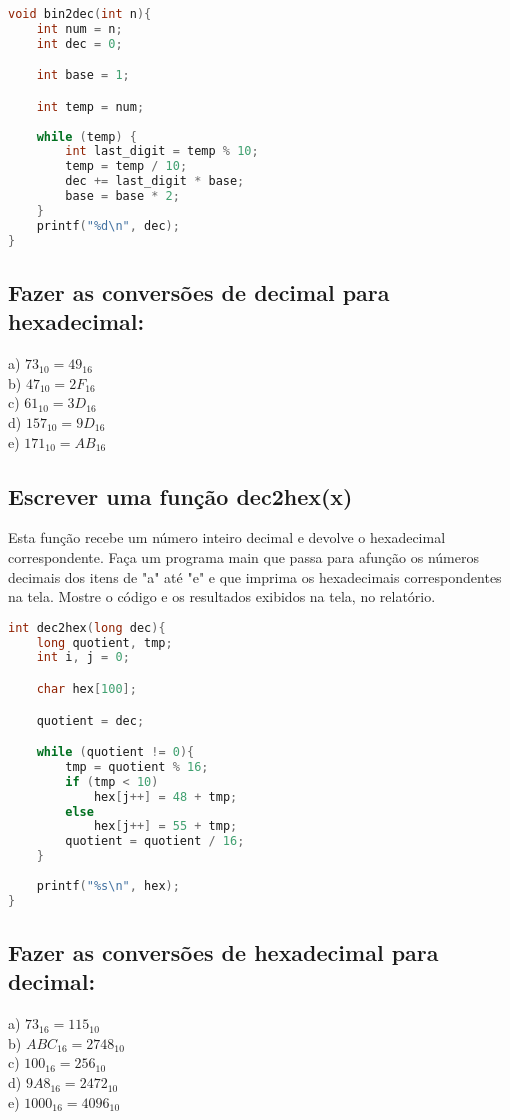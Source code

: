 \documentclass[12pt]{article}
\begin{document}
\begin{lstlisting}[language=C]
void bin2dec(int n){
    int num = n;
    int dec = 0;

    int base = 1;

    int temp = num;
    
    while (temp) {
        int last_digit = temp % 10;
        temp = temp / 10;
        dec += last_digit * base;
        base = base * 2;
    }
    printf("%d\n", dec);
}
\end{lstlisting}

\subsection{Fazer as conversões de decimal para hexadecimal:}
a) $73_{10}= 49_{16}$\\
b) $47_{10}= 2F_{16}$\\
c) $61_{10}= 3D_{16}$\\
d) $157_{10}= 9D_{16}$\\
e) $171_{10}= AB_{16}$\\

\subsection{Escrever uma função dec2hex(x)}
Esta função recebe um número inteiro decimal e devolve o hexadecimal correspondente. Faça um 
programa main que passa para afunção os números decimais dos itens de "a" até "e" e que imprima 
os hexadecimais correspondentes na tela. Mostre o código e os resultados exibidos na tela, 
no relatório.

\begin{lstlisting}[language=C]
int dec2hex(long dec){
    long quotient, tmp;
    int i, j = 0;

    char hex[100];

    quotient = dec;

    while (quotient != 0){
        tmp = quotient % 16;
        if (tmp < 10)
            hex[j++] = 48 + tmp;
        else
            hex[j++] = 55 + tmp;
        quotient = quotient / 16;
    }
    
    printf("%s\n", hex);
}
\end{lstlisting}

\subsection{Fazer as conversões de hexadecimal para decimal:}
a) $73_{16} = 115_{10}$\\
b) $ABC_{16} = 2748_{10}$\\
c) $100_{16} = 256_{10}$\\
d) $9A8_{16} = 2472_{10}$\\
e) $1000_{16} = 4096_{10}$\\
\end{document}
